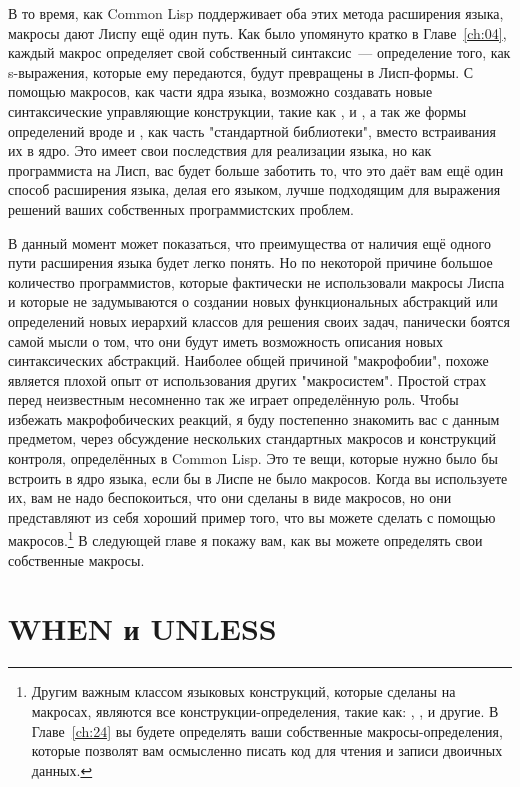 В то время, как Common Lisp поддерживает оба этих метода расширения языка, макросы дают
Лиспу ещё один путь.  Как было упомянуто кратко в Главе~\ref{ch:04}, каждый макрос определяет свой
собственный синтаксис~--- определение того, как s-выражения, которые ему передаются, будут
превращены в Лисп-формы. С помощью макросов, как части ядра языка, возможно создавать
новые синтаксические управляющие конструкции, такие как ,  и
, а так же формы определений вроде  и , как
часть "стандартной библиотеки", вместо встраивания их в ядро. Это имеет свои последствия
для реализации языка, но как программиста на Лисп, вас будет больше заботить то, что это
даёт вам ещё один способ расширения языка, делая его языком, лучше подходящим для
выражения решений ваших собственных программистских проблем.

В данный момент может показаться, что преимущества от наличия ещё одного пути расширения
языка будет легко понять. Но по некоторой причине большое количество программистов,
которые фактически не использовали макросы Лиспа и которые не задумываются о создании
новых функциональных абстракций или определений новых иерархий классов для решения своих
задач, панически боятся самой мысли о том, что они будут иметь возможность описания новых
синтаксических абстракций. Наиболее общей причиной "макрофобии", похоже является плохой
опыт от использования других "макросистем". Простой страх перед неизвестным несомненно так
же играет определённую роль. Чтобы избежать макрофобических реакций, я буду постепенно
знакомить вас с данным предметом, через обсуждение нескольких стандартных макросов и
конструкций контроля, определённых в Common Lisp. Это те вещи, которые нужно было бы
встроить в ядро языка, если бы в Лиспе не было макросов. Когда вы используете их, вам не
надо беспокоиться, что они сделаны в виде макросов, но они представляют из себя хороший
пример того, что вы можете сделать с помощью макросов.\footnote{Другим важным классом
  языковых конструкций, которые сделаны на макросах, являются все конструкции-определения,
  такие как: , ,  и другие. В Главе~\ref{ch:24} вы
  будете определять ваши собственные макросы-определения, которые позволят вам осмысленно
  писать код для чтения и записи двоичных данных.} В следующей главе я покажу вам, как вы
можете определять свои собственные макросы.

\section{WHEN и UNLESS}

